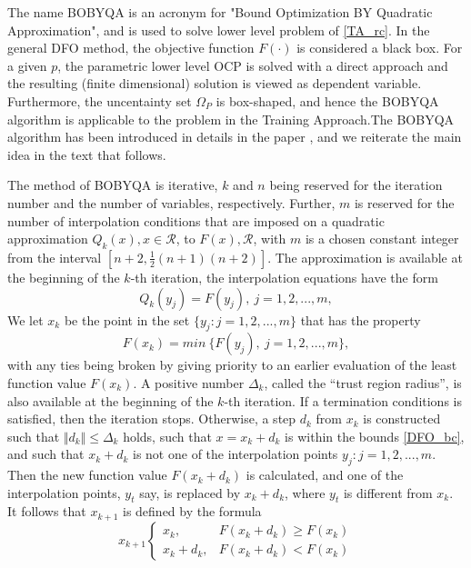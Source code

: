 The name BOBYQA is an acronym for "Bound Optimization BY Quadratic Approximation", and is used to solve lower level problem of \ref{TA_rc}. In the general DFO method, the objective function $F(\cdot)$ is considered a black box. For a given $p$, the parametric lower level OCP is solved with a direct approach and the resulting (finite dimensional) solution is viewed as dependent variable. Furthermore, the uncentainty set $\Omega_P$ is box-shaped, and hence the BOBYQA algorithm is applicable to the problem in the Training Approach.The BOBYQA algorithm has been introduced in details in the paper \cite{MicPow22}, and we reiterate the main idea in the text that follows.  

The method of BOBYQA is iterative, $k$ and $n$ being reserved for the iteration number and the number of variables, respectively. Further, $m$ is reserved for the number of interpolation conditions that are imposed on a quadratic approximation $Q_k(x), x \in \mathcal{R}$, to $F(x), \mathcal{R}$, with $m$ is a chosen constant  integer from the interval $[n+2, \frac{1}{2}(n+1)(n+2)]$. The approximation is available at the beginning of the $k$-th iteration, the interpolation equations have the form
\begin{equation}
  Q_k(y_j)= F(y_j),\   j = 1, 2, ..., m, 
\end{equation}
We let $x_k$ be the point in the set $\{y_j : j = 1, 2, ... , m\}$ that has the property
\begin{equation}
	F(x_k)= min\ \{F(y_j), \  j = 1, 2, ..., m\}, 
\end{equation}
with any ties being broken by giving priority to an earlier evaluation of the least function value $F(x_k)$. A positive number $\Delta_k$, called the “trust region radius”, is also available at the beginning of the $k$-th iteration. If a termination conditions is satisfied, then the iteration stops. Otherwise, a step $d_k$ from $x_k$ is constructed such 
that $ \Vert d_k \Vert \leq \Delta_k $ holds, such that $x = x_k+d_k$ is within the bounds \ref{DFO_bc}, and such that $x_k+d_k$ is not one of the interpolation points $y_j : j = 1, 2, ... , m$. Then the new function value $F(x_k+d_k)$ is calculated, and one of the interpolation points, $y_t$ say, is replaced by $x_k+d_k$, where $y_t$ is different from $x_k$. It follows that $x_{k+1}$ is defined by the formula
\begin{equation}
	x_{k+1}
	\begin{cases}
		 x_k, & F(x_k+d_k) \geq F(x_k) \\
		x_k+d_k  , & F(x_k+d_k) < F(x_k) 
	\end{cases}
\end{equation}

